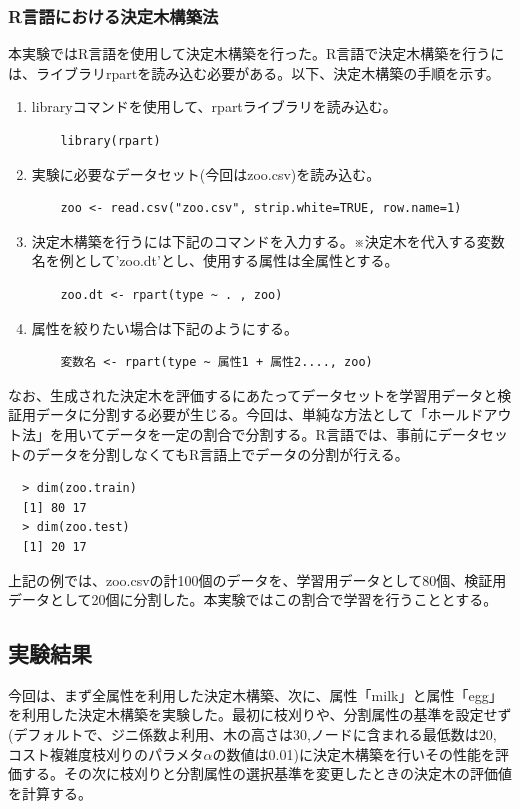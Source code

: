 \documentclass[dvipdfmx]{jsarticle}
\begin{document}
\subsubsection{R言語における決定木構築法}
本実験ではR言語を使用して決定木構築を行った。R言語で決定木構築を行うには、ライブラリrpartを読み込む必要がある。以下、決定木構築の手順を示す。
\begin{enumerate}
  \item libraryコマンドを使用して、rpartライブラリを読み込む。
  \begin{verbatim}
    library(rpart)
  \end{verbatim}
  \item 実験に必要なデータセット(今回はzoo.csv)を読み込む。
  \begin{verbatim}
    zoo <- read.csv("zoo.csv", strip.white=TRUE, row.name=1)
  \end{verbatim}
  \item 決定木構築を行うには下記のコマンドを入力する。※決定木を代入する変数名を例として’zoo.dt’とし、使用する属性は全属性とする。
  \begin{verbatim}
    zoo.dt <- rpart(type ~ . , zoo)
  \end{verbatim}
  \item 属性を絞りたい場合は下記のようにする。
  \begin{verbatim}
    変数名 <- rpart(type ~ 属性1 + 属性2...., zoo)
  \end{verbatim}
\end{enumerate}
なお、生成された決定木を評価するにあたってデータセットを学習用データと検証用データに分割する必要が生じる。今回は、単純な方法として「ホールドアウト法」を用いてデータを一定の割合で分割する。R言語では、事前にデータセットのデータを分割しなくてもR言語上でデータの分割が行える。
\begin{center}
  \begin{verbatim}
  > dim(zoo.train)
  [1] 80 17
  > dim(zoo.test)
  [1] 20 17
  \end{verbatim}
\end{center}
上記の例では、zoo.csvの計100個のデータを、学習用データとして80個、検証用データとして20個に分割した。本実験ではこの割合で学習を行うこととする。
\subsection{実験結果}
今回は、まず全属性を利用した決定木構築、次に、属性「milk」と属性「egg」を利用した決定木構築を実験した。最初に枝刈りや、分割属性の基準を設定せず(デフォルトで、ジニ係数よ利用、木の高さは30,ノードに含まれる最低数は20, コスト複雑度枝刈りのパラメタ$\alpha$の数値は0.01)に決定木構築を行いその性能を評価する。その次に枝刈りと分割属性の選択基準を変更したときの決定木の評価値を計算する。
\end{document}
